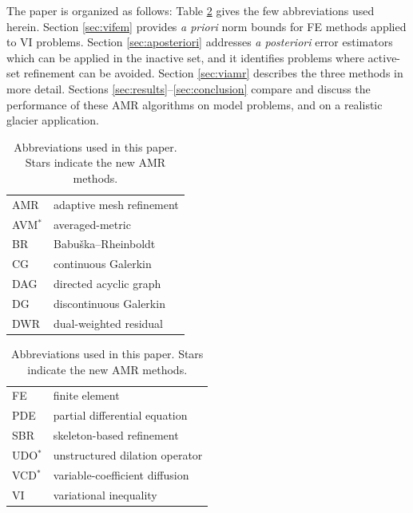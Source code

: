 \documentclass[]{interact}
\theoremstyle{plain}%
\theoremstyle{definition}
\theoremstyle{remark}
\begin{document}
The paper is organized as follows:  Table \ref{tab:abbrev} gives the few abbreviations used herein.  Section \ref{sec:vifem} provides \emph{a priori} norm bounds for FE methods applied to VI problems.  Section \ref{sec:aposteriori} addresses \emph{a posteriori} error estimators which can be applied in the inactive set, and it identifies problems where active-set refinement can be avoided.  Section \ref{sec:viamr} describes the three methods in more detail.  Sections \ref{sec:results}--\ref{sec:conclusion} compare and discuss the performance of these AMR algorithms on model problems, and on a realistic glacier application.

\begin{table}[ht]
\centering
\begin{minipage}[t]{0.45\textwidth}
\vspace{0pt}
{\small
\begin{tabular}{ll} \\
AMR       & adaptive mesh refinement \\
AVM$^*$   & averaged-metric \\
BR        & Babu\v{s}ka--Rheinboldt \\
CG        & continuous Galerkin \\
DAG       & directed acyclic graph \\
DG        & discontinuous Galerkin \\
DWR       & dual-weighted residual
\end{tabular}
}
\end{minipage}
\quad
\begin{minipage}[t]{0.45\textwidth}
\vspace{0pt}
{\small
\begin{tabular}{ll} \\
FE        & finite element \\
PDE       & partial differential equation \\
SBR       & skeleton-based refinement \\
UDO$^*$   & unstructured dilation operator \\
VCD$^*$   & variable-coefficient diffusion \\
VI        & variational inequality
\end{tabular}
}
\end{minipage}


\caption{Abbreviations used in this paper.  Stars indicate the new AMR methods.}
\label{tab:abbrev}
\end{table}
\end{document}
